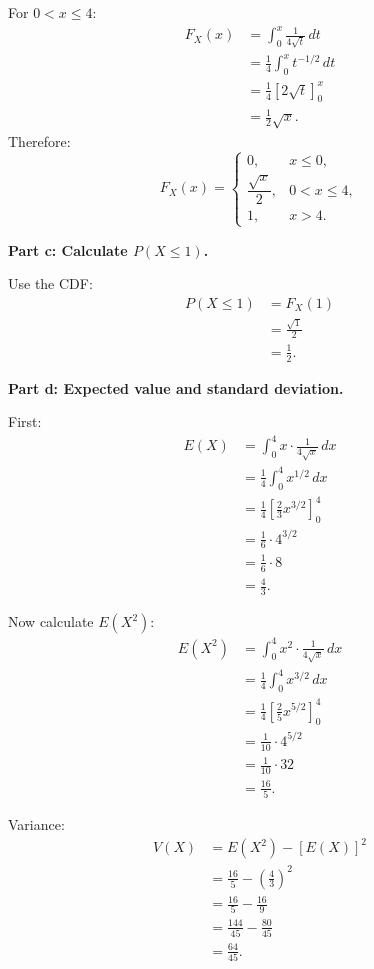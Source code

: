 \documentclass[11pt,a4paper]{article}
\begin{document}
For \(0<x\le 4\):
\begin{align*}
F_X(x)
&=\int_0^x \frac{1}{4\sqrt{t}}\,dt\\
&=\frac{1}{4}\int_0^x t^{-1/2}\,dt\\
&=\frac{1}{4}[2\sqrt{t}]_0^x\\
&=\frac{1}{2}\sqrt{x}.
\end{align*}
Therefore:
\[
F_X(x)=
\begin{cases}
0, & x\le 0,\\[1mm]
\dfrac{\sqrt{x}}{2}, & 0<x\le 4,\\[2mm]
1, & x>4.
\end{cases}
\]

\textbf{Part c: Calculate \(P(X\le 1)\).}

Use the CDF:
\begin{align*}
P(X\le 1)
&=F_X(1)\\
&=\frac{\sqrt{1}}{2}\\
&=\frac{1}{2}.
\end{align*}

\textbf{Part d: Expected value and standard deviation.}

First:
\begin{align*}
E(X)
&=\int_0^4 x\cdot \frac{1}{4\sqrt{x}}\,dx\\
&=\frac{1}{4}\int_0^4 x^{1/2}\,dx\\
&=\frac{1}{4}\left[\frac{2}{3}x^{3/2}\right]_0^4\\
&=\frac{1}{6}\cdot 4^{3/2}\\
&=\frac{1}{6}\cdot 8\\
&=\frac{4}{3}.
\end{align*}

Now calculate \(E(X^2)\):
\begin{align*}
E(X^2)
&=\int_0^4 x^2\cdot \frac{1}{4\sqrt{x}}\,dx\\
&=\frac{1}{4}\int_0^4 x^{3/2}\,dx\\
&=\frac{1}{4}\left[\frac{2}{5}x^{5/2}\right]_0^4\\
&=\frac{1}{10}\cdot 4^{5/2}\\
&=\frac{1}{10}\cdot 32\\
&=\frac{16}{5}.
\end{align*}

Variance:
\begin{align*}
V(X)
&=E(X^2)-[E(X)]^2\\
&=\frac{16}{5}-\left(\frac{4}{3}\right)^2\\
&=\frac{16}{5}-\frac{16}{9}\\
&=\frac{144}{45}-\frac{80}{45}\\
&=\frac{64}{45}.
\end{align*}
\end{document}
